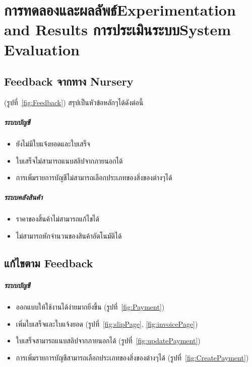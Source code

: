 \chapter{\ifproject%
\ifcpe การทดลองและผลลัพธ์\else Experimentation and Results\fi
\else%
\ifcpe การประเมินระบบ\else System Evaluation\fi
\fi}

\section{Feedback จากทาง Nursery}
(รูปที่~\ref{fig:Feedback})
สรุปเป็นหัวข้อหลักๆได้ดังต่อนี้
\paragraph{ระบบบัญชี}
\begin{itemize}
    \item ยังไม่มีใบแจ้งยอดและใบเสร็จ
    \item ใบเสร็จไม่สามารถแนบสลิปจากภายนอกได้
    \item การเพิ่มรายการบัญชีไม่สามารถเลือกประเภทของสิ่งของต่างๆได้ 
\end{itemize}
\paragraph{ระบบคลังสินค้า}
\begin{itemize}
    \item ราคาของสิ้นค้าไม่สามารถแก้ไขได้
    \item ไม่สามารถหักจำนวนของสินค้าอัตโนมัติได้
\end{itemize}

\section{แก้ไขตาม Feedback}
\paragraph{ระบบบัญชี}
\begin{itemize}
    \item ออกแบบให้ใช้งานได้ง่ายมากยิ่งขึ้น (รูปที่~\ref{fig:Payment})
    \item เพิ่มใบเสร็จและใบแจ้งยอด (รูปที่~\ref{fig:slipPage}, \ref{fig:invoicePage})
    \item ใบเสร็จสามารถแนบสลิปจากภายนอกได้ (รูปที่~\ref{fig:updatePayment})
    \item การเพิ่มรายการบัญชีสามารถเลือกประเภทของสิ่งของต่างๆได้ (รูปที่~\ref{fig:CreatePayment})
\end{itemize}
